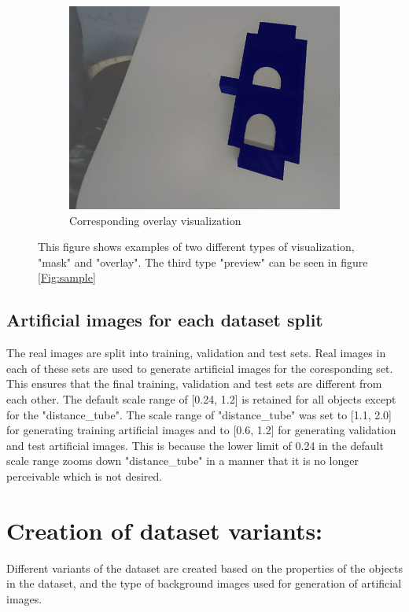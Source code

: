 \begin{itemize}
\begin{figure}
\begin{subfigure}{.3\textwidth}
  				\includegraphics[width=.9\linewidth]{images/eg_overlay}
  				\caption{Corresponding overlay visualization}
  				\label{Fig:visualsc}
			\end{subfigure}%
		\caption{This figure shows examples of two different types of visualization, "mask" and "overlay". The third type "preview" can be seen in figure \ref{Fig:sample}}
		\label{Fig:visuals}
		\end{figure}
		
	\end{itemize}
	
\subsection{Artificial images for each dataset split}

The real images are split into training, validation and test sets. Real images in each of these sets are used to generate artificial images for the coresponding set. This ensures that the final training, validation and test sets are different from each other. The default scale range of [0.24, 1.2] is retained for all objects except for the "distance\_tube". The scale range of "distance\_tube" was set to [1.1, 2.0] for generating training artificial images and to [0.6, 1.2] for generating validation and test artificial images. This is because the lower limit of 0.24 in the default scale range zooms down "distance\_tube" in a manner that it is no longer perceivable which is not desired.

\section{Creation of dataset variants:}
Different variants of the dataset are created based on the properties of the objects in the dataset, and the type of  background images used for generation of artificial images.

